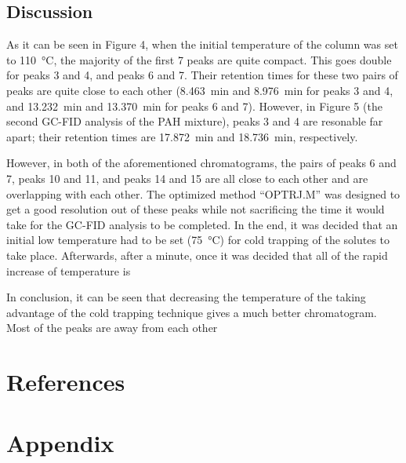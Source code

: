 \documentclass[a4paper, 12pt]{article}
\begin{document}
\subsection{Discussion}
As it can be seen in Figure 4, when the initial temperature of the column was set to \SI{110}{\degreeCelsius}, the majority of the first \num{7} peaks are quite compact. This goes double for peaks \num{3} and \num{4}, and peaks \num{6} and \num{7}. Their retention times for these two pairs of peaks are quite close to each other (\SI{8.463}{min} and \SI{8.976}{min} for peaks \num{3} and \num{4}, and \SI{13.232}{min} and \SI{13.370}{min} for peaks \num{6} and \num{7}). However, in Figure \num{5} (the second GC-FID analysis of the PAH mixture), peaks \num{3} and \num{4} are resonable far apart; their retention times are \SI{17.872}{min} and \SI{18.736}{min}, respectively.

However, in both of the aforementioned chromatograms, the pairs of peaks \num{6} and \num{7}, peaks \num{10} and \num{11}, and peaks \num{14} and \num{15} are all close to each other and are overlapping with each other. The optimized method ``OPTRJ.M'' was designed to get a good resolution out of these peaks while not sacrificing the time it would take for the GC-FID analysis to be completed. In the end, it was decided that an initial low temperature had to be set (\SI{75}{\degreeCelsius}) for cold trapping of the solutes to take place. Afterwards, after a minute, once it was decided that all of the rapid increase of temperature is 

In conclusion, it can be seen that decreasing the temperature of the taking advantage of the cold trapping technique gives a much better chromatogram. Most of the peaks are away from each other 


\section{References}
\printbibliography


\section{Appendix}
\end{document}
